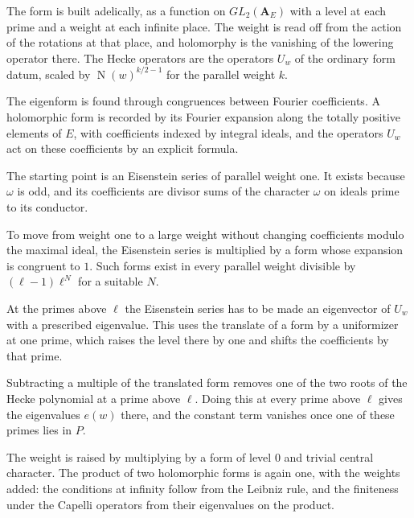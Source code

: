 The form is built adelically, as a function on $GL_2(\mathbf A_E)$ with a level at each prime and a weight at each infinite place. The weight is read off from the action of the rotations at that place, and holomorphy is the vanishing of the lowering operator there. The Hecke operators are the operators $U_w$ of the ordinary form datum, scaled by $\operatorname N(w)^{k/2-1}$ for the parallel weight $k$.

The eigenform is found through congruences between Fourier coefficients. A holomorphic form is recorded by its Fourier expansion along the totally positive elements of $E$, with coefficients indexed by integral ideals, and the operators $U_w$ act on these coefficients by an explicit formula.

The starting point is an Eisenstein series of parallel weight one. It exists because $\omega$ is odd, and its coefficients are divisor sums of the character $\omega$ on ideals prime to its conductor.

To move from weight one to a large weight without changing coefficients modulo the maximal ideal, the Eisenstein series is multiplied by a form whose expansion is congruent to $1$. Such forms exist in every parallel weight divisible by $(\ell-1)\ell^N$ for a suitable $N$.

At the primes above $\ell$ the Eisenstein series has to be made an eigenvector of $U_w$ with a prescribed eigenvalue. This uses the translate of a form by a uniformizer at one prime, which raises the level there by one and shifts the coefficients by that prime.

Subtracting a multiple of the translated form removes one of the two roots of the Hecke polynomial at a prime above $\ell$. Doing this at every prime above $\ell$ gives the eigenvalues $e(w)$ there, and the constant term vanishes once one of these primes lies in $P$.

The weight is raised by multiplying by a form of level $0$ and trivial central character. The product of two holomorphic forms is again one, with the weights added: the conditions at infinity follow from the Leibniz rule, and the finiteness under the Capelli operators from their eigenvalues on the product.

